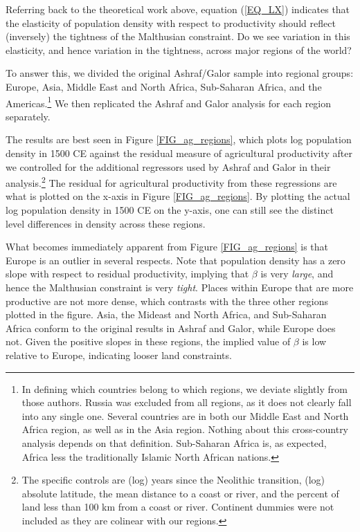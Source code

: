 \documentclass[11pt]{article}
\begin{document}
Referring back to the theoretical work above, equation (\ref{EQ_LX}) indicates that the elasticity of population density with respect to productivity should reflect (inversely) the tightness of the Malthusian constraint. Do we see variation in this elasticity, and hence variation in the tightness, across major regions of the world?

To answer this, we divided the original Ashraf/Galor sample into regional groups: Europe, Asia, Middle East and North Africa, Sub-Saharan Africa, and the Americas.\footnote{In defining which countries belong to which regions, we deviate slightly from those authors. Russia was excluded from all regions, as it does not clearly fall into any single one. Several countries are in both our Middle East and North Africa region, as well as in the Asia region. Nothing about this cross-country analysis depends on that definition. Sub-Saharan Africa is, as expected, Africa less the traditionally Islamic North African nations.} We then replicated the Ashraf and Galor analysis for each region separately.

The results are best seen in Figure \ref{FIG_ag_regions}, which plots log population density in 1500 CE against the residual measure of agricultural productivity after we controlled for the additional regressors used by Ashraf and Galor in their analysis.\footnote{The specific controls are (log) years since the Neolithic transition, (log) absolute latitude, the mean distance to a coast or river, and the percent of land less than 100 km from a coast or river. Continent dummies were not included as they are colinear with our regions.} The residual for agricultural productivity from these regressions are what is plotted on the x-axis in Figure \ref{FIG_ag_regions}. By plotting the actual log population density in 1500 CE on the y-axis, one can still see the distinct level differences in density across these regions.

What becomes immediately apparent from Figure \ref{FIG_ag_regions} is that Europe is an outlier in several respects. Note that population density has a zero slope with respect to residual productivity, implying that $\beta$ is very \textit{large}, and hence the Malthusian constraint is very \textit{tight}. Places within Europe that are more productive are not more dense, which contrasts with the three other regions plotted in the figure. Asia, the Mideast and North Africa, and Sub-Saharan Africa conform to the original results in Ashraf and Galor, while Europe does not. Given the positive slopes in these regions, the implied value of $\beta$ is low relative to Europe, indicating looser land constraints.
\end{document}
